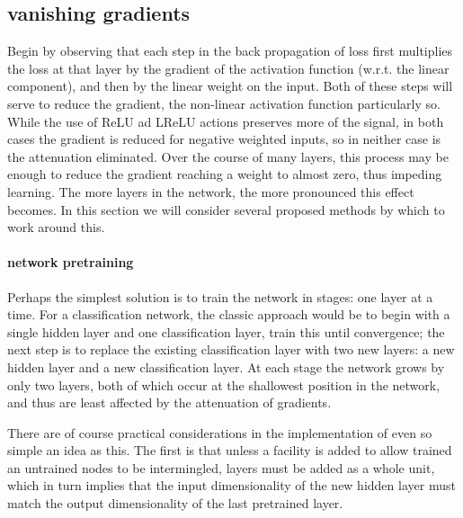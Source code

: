 \documentclass[msc]{infthesis}
\begin{document}
\subsection{vanishing gradients}
\label{sec:classification:deep:gradients}

Begin by observing that each step in the back propagation of loss first multiplies the loss at
that layer by the gradient of the activation function (w.r.t. the linear component), and then
by the linear weight on the input.  Both of these steps will serve to reduce the gradient, the
non-linear activation function particularly so.  While the use of ReLU ad LReLU actions preserves
more of the signal, in both cases the gradient is reduced for negative weighted inputs, so in
neither case is the attenuation eliminated.  Over the course of many layers, this process may
be enough to reduce the gradient reaching a weight to almost zero, thus impeding learning.  The
more layers in the network, the more pronounced this effect becomes.  In this section we will
consider several proposed methods by which to work around this. 


\paragraph*{network pretraining}
%
Perhaps the simplest solution is to train the network in stages: one layer at a time.  For a
classification network, the classic approach would be to begin with a single hidden layer and
one classification layer, train this until convergence; the next step is to replace the existing
classification layer with two new layers: a new hidden layer and a new classification layer. At
each stage the network grows by only two layers, both of which occur at the shallowest position
in the network, and thus are least affected by the attenuation of gradients.

There are of course practical considerations in the implementation of even so simple an idea as
this.  The first is that unless a facility is added to allow trained an untrained nodes to be
intermingled, layers must be added as a whole unit, which in turn implies that the input
dimensionality of the new hidden layer must match the output dimensionality of the last
pretrained layer.
\end{document}

